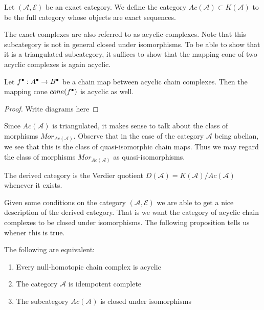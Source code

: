     \begin{definition}
        Let $(\mathcal{A},\mathcal{E})$ be an exact category. We define the category $Ac(\mathcal{A})\subset K(\mathcal{A})$ to be the full category whose objects are exact sequences.
    \end{definition}

    The exact complexes are also referred to as acyclic complexes. Note that this subcategory is not in general closed under isomorphisms. To be able to show that it is a triangulated subcategory, it suffices to show that the mapping cone of two acyclic complexes is again acyclic.

    \begin{lemma}
        Let $f^{\bullet}:A^{\bullet}\rightarrow B^{\bullet}$ be a chain map between acyclic chain complexes. Then the mapping cone $cone(f^{\bullet})$ is acyclic as well.
    \end{lemma}

    \begin{proof}
        Write diagrams here
    \end{proof}

    Since $Ac(\mathcal{A})$ is triangulated, it makes sense to talk about the class of morphisms $Mor_{Ac(\mathcal{A})}$. Observe that in the case of the category $\mathcal{A}$ being abelian, we see that this is the class of quasi-isomorphic chain maps. Thus we may regard the class of morphisms $Mor_{Ac(\mathcal{A})}$ as quasi-isomorphisms.

    \begin{definition}
        The derived category is the Verdier quotient $D(\mathcal{A})=K(\mathcal{A})/Ac(\mathcal{A})$ whenever it exists. 
    \end{definition}

    Given some conditions on the category $(\mathcal{A},\mathcal{E})$ we are able to get a nice description of the derived category. That is we want the category of acyclic chain complexes to be closed under isomorphisms. The following proposition tells us whener this is true.

    \begin{lemma}
        The following are equivalent:
        \begin{enumerate}
            \item Every null-homotopic chain complex is acyclic
            \item The category $\mathcal{A}$ is idempotent complete
            \item The subcategory $Ac(\mathcal{A})$ is closed under isomorphisms
        \end{enumerate}
    \end{lemma}

